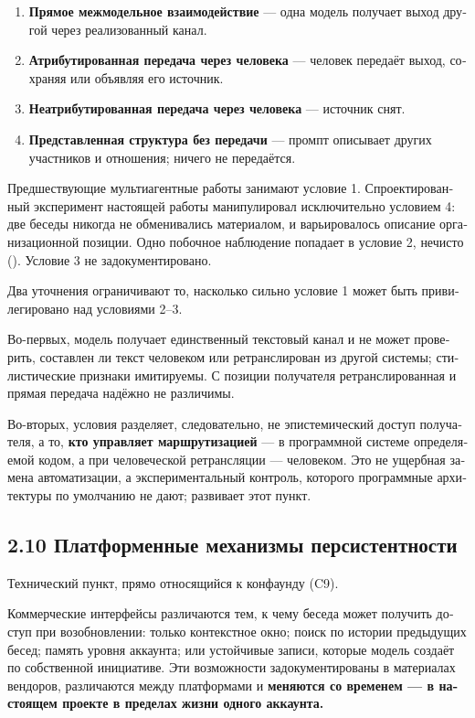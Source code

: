 \begin{russian}
\begin{enumerate}
  \item \textbf{Прямое межмодельное взаимодействие} — одна модель получает выход другой через реализованный канал.
  \item \textbf{Атрибутированная передача через человека} — человек передаёт выход, сохраняя или объявляя его источник.
  \item \textbf{Неатрибутированная передача через человека} — источник снят.
  \item \textbf{Представленная структура без передачи} — промпт описывает других участников и отношения; ничего не передаётся.
\end{enumerate}
Предшествующие мультиагентные работы занимают условие 1. Спроектированный эксперимент настоящей работы манипулировал исключительно условием 4: две беседы никогда не обменивались материалом, и варьировалось описание организационной позиции. Одно побочное наблюдение попадает в условие 2, нечисто (). Условие 3 не задокументировано.

Два уточнения ограничивают то, насколько сильно условие 1 может быть привилегировано над условиями 2–3.

Во-первых, модель получает единственный текстовый канал и не может проверить, составлен ли текст человеком или ретранслирован из другой системы; стилистические признаки имитируемы. С позиции получателя ретранслированная и прямая передача надёжно не различимы.

Во-вторых, условия разделяет, следовательно, не эпистемический доступ получателя, а то, \textbf{кто управляет маршрутизацией} — в программной системе определяемой кодом, а при человеческой ретрансляции — человеком. Это не ущербная замена автоматизации, а экспериментальный контроль, которого программные архитектуры по умолчанию не дают;  развивает этот пункт.


\subsection*{2.10 Платформенные механизмы персистентности}
\label{sec:ru:2.10}

Технический пункт, прямо относящийся к конфаунду  (C9).

Коммерческие интерфейсы различаются тем, к чему беседа может получить доступ при возобновлении: только контекстное окно; поиск по истории предыдущих бесед; память уровня аккаунта; или устойчивые записи, которые модель создаёт по собственной инициативе. Эти возможности задокументированы в материалах вендоров, различаются между платформами и \textbf{меняются со временем — в настоящем проекте в пределах жизни одного аккаунта.}


\end{russian}
